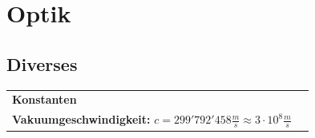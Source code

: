 \section{Optik}

\subsection{Diverses}
\begin{tabular}{p{10cm}p{6cm}}
   \textbf{Konstanten} \\
   \textbf{Vakuumgeschwindigkeit:} \newline 
  $c=299'792'458 \frac{m}{s} \approx 3 \cdot 10^8 \frac{m}{s}$ \\
\end{tabular}


